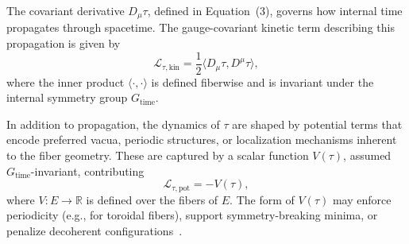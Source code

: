 \documentclass[11pt]{article}
\begin{document}
The covariant derivative \( D_\mu \tau \), defined in Equation~(3), governs how internal time propagates through spacetime. The gauge-covariant kinetic term describing this propagation is given by
\begin{equation}
\mathcal{L}_{\tau,\text{kin}} = \frac{1}{2} \langle D_\mu \tau, D^\mu \tau \rangle,
\end{equation}
where the inner product \( \langle \cdot, \cdot \rangle \) is defined fiberwise and is invariant under the internal symmetry group \( G_{\text{time}} \).

In addition to propagation, the dynamics of \( \tau \) are shaped by potential terms that encode preferred vacua, periodic structures, or localization mechanisms inherent to the fiber geometry. These are captured by a scalar function \( V(\tau) \), assumed \( G_{\text{time}} \)-invariant, contributing
\begin{equation}
\mathcal{L}_{\tau,\text{pot}} = -V(\tau),
\end{equation}
where \( V : E \to \mathbb{R} \) is defined over the fibers of \( E \). The form of \( V(\tau) \) may enforce periodicity (e.g., for toroidal fibers), support symmetry-breaking minima, or penalize decoherent configurations~\cite{coleman1977fate, conlon1988physics, zurek2003decoherence}.
\end{document}
